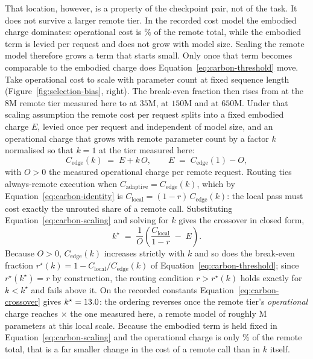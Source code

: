 That location, however, is a property of the checkpoint pair, not of
the task. It does not survive a larger remote tier. In the recorded cost
model the embodied charge dominates: operational cost is
\ScaleOperationalShareEdge{}\% of the remote total, while the embodied term is
levied per request and does not grow with model size. Scaling the remote model
therefore grows a term that starts small. Only once that term becomes
comparable to the embodied charge does
Equation~\ref{eq:carbon-threshold} move. Take operational cost to scale with
parameter count at fixed sequence length (Figure~\ref{fig:selection-bias},
right). The break-even fraction then rises from
\ScaleBreakEvenMeasured{} at the \(8\)M remote tier measured here to
\ScaleSmallBreakEven{} at \(35\)M, \ScaleMidBreakEven{} at \(150\)M and
\ScaleLargeBreakEven{} at \(650\)M. Under that scaling assumption the remote
cost per request splits into a fixed embodied charge \(E\), levied once per
request and independent of model size, and an operational charge that grows
with remote parameter count by a factor \(k\) normalised so that \(k=1\) at
the tier measured here:
\begin{equation}
C_{\text{edge}}(k) \;=\; E + k\,O,
\qquad E \;=\; C_{\text{edge}}(1) - O,
\label{eq:carbon-scaling}
\end{equation}
with \(O>0\) the measured operational charge per remote request. Routing ties
always-remote execution when \(C_{\text{adaptive}} = C_{\text{edge}}(k)\),
which by Equation~\ref{eq:carbon-identity} is
\(C_{\text{local}} = (1-r)\,C_{\text{edge}}(k)\): the local pass must cost
exactly the unrouted share of a remote call. Substituting
Equation~\ref{eq:carbon-scaling} and solving for \(k\) gives the crossover in
closed form,
\begin{equation}
k^{\star} \;=\; \frac{1}{O}\left(\frac{C_{\text{local}}}{1-r} \;-\; E\right).
\label{eq:carbon-crossover}
\end{equation}
Because \(O>0\), \(C_{\text{edge}}(k)\) increases strictly with \(k\) and so
does the break-even fraction
\(r^{\star}(k) = 1 - C_{\text{local}}/C_{\text{edge}}(k)\) of
Equation~\ref{eq:carbon-threshold}; since \(r^{\star}(k^{\star})=r\) by
construction, the routing condition \(r>r^{\star}(k)\) holds exactly for
\(k<k^{\star}\) and fails above it. On the recorded constants
Equation~\ref{eq:carbon-crossover} gives
\(k^{\star}=13.0{}\): the ordering reverses once the
remote tier's \emph{operational} charge reaches \ScaleCrossoverFactor{}\(\times\)
the one measured here, a remote model of roughly \ScaleCrossoverParams{}M
parameters at this local scale. Because the embodied term is held fixed in
Equation~\ref{eq:carbon-scaling} and the operational charge is only
\ScaleOperationalShareEdge{}\% of the remote total, that is a far smaller
change in the cost of a remote call than in \(k\) itself.

